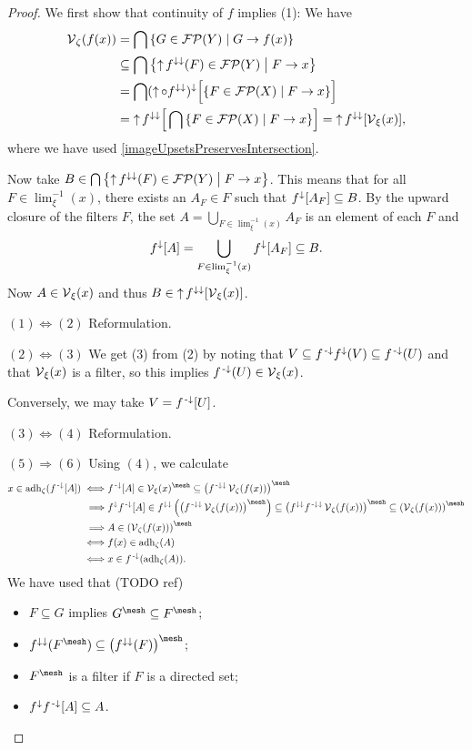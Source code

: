 \begin{proof}
We first show that continuity of $f$ implies (1): We have
\begin{align*}
\vicinities_\zeta(f(x)) &= \bigcap\setbuilder{G\in\powerfilters(Y)}{G\to f(x)} \\
&\subseteq \bigcap\setbuilder{\upset f^{\imf\imf}(F)\in\powerfilters(Y)}{F\to x} \\
&= \bigcap (\upset\circ f^{\imf\imf})^{\imf}\Big[\setbuilder{F\in\powerfilters(X)}{F\to x}\Big] \\
&= \upset f^{\imf\imf}\Big[\bigcap \setbuilder{F\in\powerfilters(X)}{F\to x}\Big] = \upset f^{\imf\imf}[\vicinities_\xi(x)],
\end{align*}
where we have used \ref{imageUpsetsPreservesIntersection}.

Now take $B\in \bigcap\setbuilder{\upset f^{\imf\imf}(F)\in\powerfilters(Y)}{F\to x}$. This means that for all $F\in\lim^{-1}_\xi(x)$, there exists an $A_F\in F$ such that $f^\downarrow[A_F]\subseteq B$. By the upward closure of the filters $F$, the set $A = \bigcup_{F\in \lim^{-1}_\xi(x)}A_F$ is an element of each $F$ and
\[ f^\downarrow[A] = \bigcup_{F\in \lim^{-1}_\xi(x)}f^{\downarrow}[A_F] \subseteq B.  \]
Now $A\in \operatorname{\mathcal{V}}_\xi(x)$ and thus $B\in \operatorname{\uparrow} f^{\downarrow\downarrow}[\operatorname{\mathcal{V}}_\xi(x)]$.


$(1) \Leftrightarrow (2)$ Reformulation.

$(2) \Leftrightarrow (3)$ We get (3) from (2) by noting that $V\subseteq f^{{\text{\hspace{0.15em}-}\downarrow}}f^\downarrow(V) \subseteq f^{\text{\hspace{0.15em}-}\downarrow}(U)$ and that $\operatorname{\mathcal{V}}_\xi(x)$ is a filter, so this implies $f^{\text{\hspace{0.15em}-}\downarrow}(U)\in \operatorname{\mathcal{V}}_\xi(x)$.

Conversely, we may take $V = f^{{\text{\hspace{0.15em}-}\downarrow}}[U]$.

$(3) \Leftrightarrow (4)$ Reformulation.

$(5) \Rightarrow (6)$ Using $(4)$, we calculate
\begin{align*}
x\in \adh_\zeta(f^\preimf[A]) \iff& f^\preimf[A]\in \vicinities_\xi(x)^{\mesh} \subseteq \left(f^{\preimf\imf}\vicinities_\zeta(f(x))\right)^{\mesh} \\
\implies& f^\imf f^\preimf[A] \in f^{\imf\imf}\left(\left(f^{\preimf\imf}\vicinities_\zeta(f(x))\right)^{\mesh}\right) \subseteq \left(f^{\imf\imf} f^{\preimf\imf}\vicinities_\zeta(f(x))\right)^{\mesh} \subseteq \left(\vicinities_\zeta(f(x))\right)^{\mesh} \\
\implies& A \in \left(\vicinities_\zeta(f(x))\right)^{\mesh} \\
\iff& f(x)\in \adh_\zeta(A) \\
\iff& x\in f^{\preimf}(\adh_\zeta(A)).
\end{align*}
We have used that (TODO ref)
\begin{itemize}
\item $F\subseteq G$ implies $G^{\mesh} \subseteq F^{\mesh}$;
\item $f^{\imf\imf}(F^{\mesh}) \subseteq \left(f^{\imf\imf}(F)\right)^{\mesh}$;
\item $F^{\mesh}$ is a filter if $F$ is a directed set;
\item $f^\downarrow f^{\text{\hspace{0.15em}-}\downarrow}[A] \subseteq A$.
\end{itemize}


\end{proof}
